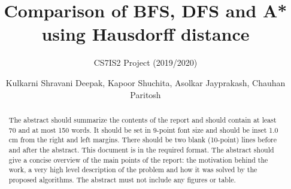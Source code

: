 \documentclass{svproc}
\begin{document}
\mainmatter
\title{Comparison of BFS, DFS and A* using Hausdorff distance}
\subtitle{CS7IS2 Project (2019/2020)}
\author{Kulkarni Shravani Deepak, Kapoor Shuchita, Asolkar Jayprakash, Chauhan Paritosh}



\maketitle

\vspace{-1cm}
\begin{abstract}
The abstract should summarize the contents of the report and should contain at least 70 and at most 150 words. It should be set in 9-point font size and should be inset 1.0 cm from the right and left margins. There should be two blank (10-point) lines before and after the abstract. This document is in the required format. The abstract should give a concise overview of the main points of the report: the motivation behind the work, a very high level description of the problem and how it was solved by the proposed algorithms. The abstract must not include any figures or table.
\end{abstract}
%

 
\end{document}
